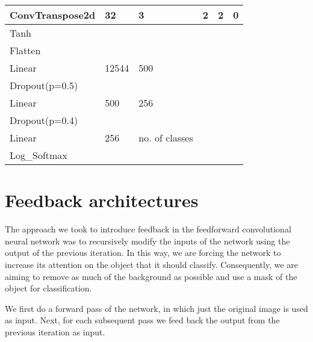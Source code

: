 \documentclass{l4proj}
\begin{document}
\begin{table}[ht!]
\begin{tabular}{|l|l|l|l|l|l|}
ConvTranspose2d & 32                    & 3                      & 2                     & 2               & 0                \\ \hline
Tanh            &                       &                        &                       &                 &                  \\ \hline
Flatten         &                       &                        &                       &                 &                  \\ \hline
Linear          & 12544                 & 500                    &                       &                 &                  \\ \hline
Dropout(p=0.5)  &                       &                        &                       &                 &                  \\ \hline
Linear          & 500                   & 256                    &                       &                 &                  \\ \hline
Dropout(p=0.4)  &                       &                        &                       &                 &                  \\ \hline
Linear          & 256                   & no. of classes         &                       &                 &                  \\ \hline
Log\_Softmax    &                       &                        &                       &                 &                  \\ \hline
\end{tabular}
\label{tab:combined}
\end{table}

\section{Feedback architectures}
The approach we took to introduce feedback in the feedforward convolutional neural network was to recursively modify the inputs of the network using the output of the previous iteration. In this way, we are forcing the network to increase its attention on the object that it should classify. Consequently, we are aiming to remove as much of the background as possible and use a mask of the object for classification.

We first do a forward pass of the network, in which just the original image is used as input. Next, for each subsequent pass we feed back the output from the previous iteration as input.
\end{document}
